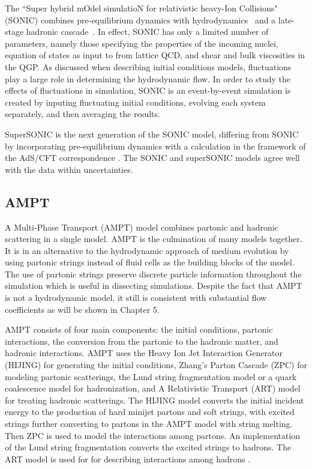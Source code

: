 The ``Super hybrid mOdel simulatioN for relativistic heavy-Ion Collisions" (SONIC) combines pre-equilibrium dynamics with hydrodynamics~\cite{PhysRevC.78.034915} and a late-stage hadronic cascade~\cite{PhysRevC.92.011901}. In effect, SONIC has only a limited number of parameters, namely those specifying the properties of the incoming nuclei, equation of states as input to from lattice QCD, and shear and bulk viscosities in the QGP. As discussed when describing initial conditions models, fluctuations play a large role in determining the hydrodynamic flow. In order to study the effects of fluctuations in simulation, SONIC is an event-by-event simulation is created by inputing fluctuating initial conditions, evolving each system separately, and then averaging the results.

SuperSONIC is the next generation of the SONIC model, differing from SONIC by incorporating pre-equilibrium dynamics with a calculation in the framework of the AdS/CFT correspondence \cite{Romatschke2015}. The SONIC and superSONIC models agree well with the data within uncertainties.
\subsection{AMPT}%
A Multi-Phase Transport (AMPT) model combines partonic and hadronic scattering in a single model. AMPT is the culmination of many models together. It is in an alternative to the hydrodynamic approach of medium evolution by using partonic strings instead of fluid cells as the building blocks of the model. The use of partonic strings preserve discrete particle information throughout the simulation which is useful in dissecting simulations. Despite the fact that AMPT is not a hydrodynamic model, it still is consistent with substantial flow coefficients as will be shown in Chapter 5.

AMPT consists of four main components: the initial conditions, partonic interactions, the conversion from the partonic to the hadronic matter, and hadronic interactions. AMPT uses the Heavy Ion Jet Interaction Generator (HIJING) for generating the initial conditions, Zhang's Parton Cascade (ZPC) for modeling partonic scatterings, the Lund string fragmentation model or a quark coalescence model for hadronization, and A Relativistic Transport (ART) model for treating hadronic scatterings. The HIJING model converts the initial incident energy to the production of hard minijet partons and soft strings, with excited strings further converting to partons in the AMPT model with string melting. Then ZPC is used to model the interactions among partons. An implementation of the Lund string fragmentation converts the excited strings to hadrons. The ART model is used for for describing interactions among hadrons \cite{PhysRevC.72.064901}.

